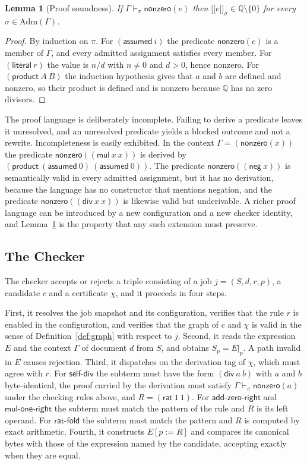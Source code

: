 \documentclass[11pt,a4paper]{article}
\theoremstyle{plain}
\newtheorem{lemma}[theorem]{Lemma}
\theoremstyle{definition}
\theoremstyle{remark}
\theoremstyle{definition}
\newcommand{\Q}{\mathbb{Q}}
\newcommand{\den}[2]{\mathopen{[\![}#1\mathclose{]\!]}_{#2}}
\newcommand{\nz}{\mathsf{nonzero}}
\newcommand{\proves}{\vdash}
\newcommand{\replace}[3]{#1[#2 \mathbin{:=} #3]}
\begin{document}
\begin{lemma}[Proof soundness]
\label{lem:proofs}
If $\Gamma \proves_\pi \nz(e)$ then $\den{e}{\sigma} \in \Q \setminus \{0\}$ for every $\sigma \in \mathrm{Adm}(\Gamma)$.
\end{lemma}

\begin{proof}
By induction on $\pi$. For $(\mathsf{assumed}\ i)$ the predicate $\nz(e)$ is a member of $\Gamma$, and every admitted assignment satisfies every member. For $(\mathsf{literal}\ r)$ the value is $n/d$ with $n \ne 0$ and $d > 0$, hence nonzero. For $(\mathsf{product}\ A\ B)$ the induction hypothesis gives that $a$ and $b$ are defined and nonzero, so their product is defined and is nonzero because $\Q$ has no zero divisors.
\end{proof}

The proof language is deliberately incomplete. Failing to derive a predicate leaves it unresolved, and an unresolved predicate yields a blocked outcome and not a rewrite. Incompleteness is easily exhibited. In the context $\Gamma = (\nz(x))$ the predicate $\nz((\mathsf{mul}\ x\ x))$ is derived by $(\mathsf{product}\ (\mathsf{assumed}\ 0)\ (\mathsf{assumed}\ 0))$. The predicate $\nz((\mathsf{neg}\ x))$ is semantically valid in every admitted assignment, but it has no derivation, because the language has no constructor that mentions negation, and the predicate $\nz((\mathsf{div}\ x\ x))$ is likewise valid but underivable. A richer proof language can be introduced by a new configuration and a new checker identity, and Lemma~\ref{lem:proofs} is the property that any such extension must preserve.

\subsection{The Checker}

The checker accepts or rejects a triple consisting of a job $j = (S,d,r,p)$, a candidate $c$ and a certificate $\chi$, and it proceeds in four steps.

First, it resolves the job snapshot and its configuration, verifies that the rule $r$ is enabled in the configuration, and verifies that the graph of $c$ and $\chi$ is valid in the sense of Definition~\ref{def:graph} with respect to $j$. Second, it reads the expression $E$ and the context $\Gamma$ of document $d$ from $S$, and obtains $S_p = E|_p$. A path invalid in $E$ causes rejection. Third, it dispatches on the derivation tag of $\chi$, which must agree with $r$. For $\mathsf{self\text{-}div}$ the subterm must have the form $(\mathsf{div}\ a\ b)$ with $a$ and $b$ byte-identical, the proof carried by the derivation must satisfy $\Gamma \proves_\pi \nz(a)$ under the checking rules above, and $R = (\mathsf{rat}\ 1\ 1)$. For $\mathsf{add\text{-}zero\text{-}right}$ and $\mathsf{mul\text{-}one\text{-}right}$ the subterm must match the pattern of the rule and $R$ is its left operand. For $\mathsf{rat\text{-}fold}$ the subterm must match the pattern and $R$ is computed by exact arithmetic. Fourth, it constructs $\replace{E}{p}{R}$ and compares its canonical bytes with those of the expression named by the candidate, accepting exactly when they are equal.
\end{document}
